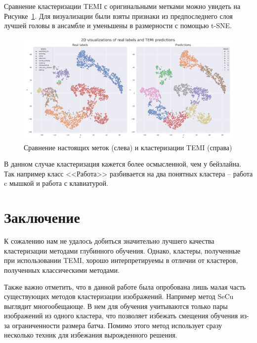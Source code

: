 \documentclass[a4paper,12pt]{extarticle}
\begin{document}
Сравнение кластеризации TEMI с оригинальными метками можно 
увидеть на Рисунке~\ref{fig:temi_visualization}. Для визуализации 
были взяты признаки из предпоследнего слоя лучшей головы в ансамбле и 
уменьшены в размерности с помощью t-SNE.

\begin{figure}[ht]
	\centering
	\includegraphics[width=1.0\textwidth]{temi_visualization.png}
	\caption{Сравнение настоящих меток (слева) и кластеризации TEMI (справа)}
	\label{fig:temi_visualization}
\end{figure}

В данном случае кластеризация кажется более осмысленной, чем у бейзлайна. 
Так например класс <<Работа>> разбивается на два понятных кластера -- работа c 
мышкой и работа с клавиатурой.

\section{Заключение}

К сожалению нам не удалось добиться значительно лучшего качества кластеризации 
методами глубинного обучения. Однако, кластеры, полученные при использовании 
TEMI, хорошо интерпретируемы в отличии от кластеров, полученных классическими методами.

Также важно отметить, что в данной работе была опробована лишь малая часть 
существующих методов кластеризации изображений. Например метод SeCu \cite{secu} выглядит 
многообещающе. В нем для обучения учитываются только пары изображений 
из одного кластера, что позволяет избежать смещения обучения из-за 
ограниченности размера батча. Помимо этого метод использует сразу 
несколько техник для избежания вырожденного решения.

\newpage 
\printbibliography[heading=bibintoc] 
	
\end{document}
